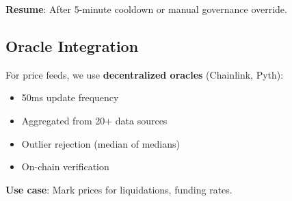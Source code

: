 \textbf{Resume}: After 5-minute cooldown or manual governance override.

\subsection{Oracle Integration}

For price feeds, we use \textbf{decentralized oracles} (Chainlink, Pyth):

\begin{itemize}
    \item 50ms update frequency
    \item Aggregated from 20+ data sources
    \item Outlier rejection (median of medians)
    \item On-chain verification
\end{itemize}

\textbf{Use case}: Mark prices for liquidations, funding rates.

